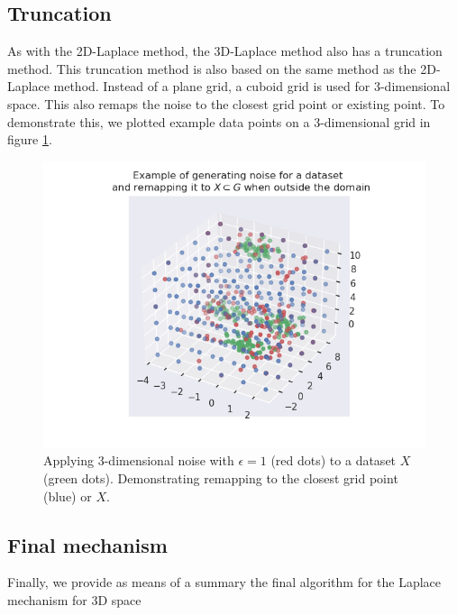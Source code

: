 \subsection{Truncation}
As with the 2D-Laplace method, the 3D-Laplace method also has a truncation method.
This truncation method is also based on the same method as the 2D-Laplace method.
Instead of a plane grid, a cuboid grid is used for 3-dimensional space.
This also remaps the noise to the closest grid point or existing point.
To demonstrate this, we plotted example data points on a 3-dimensional grid in figure \ref{fig:3d-laplace-example}.
\begin{figure} [ht]
  \includegraphics{TheorethicalFramework/ND-Laplace/Images/example_3d_laplace.png}
  \caption{Applying 3-dimensional noise with $\epsilon = 1$ (red dots) to a dataset $X$ (green dots). Demonstrating remapping to the closest grid point (blue) or $X$.}
  \label{fig:3d-laplace-example}
\end{figure}

\subsection{Final mechanism}
Finally, we provide as means of a summary the final algorithm for the Laplace mechanism for 3D space

\newpage